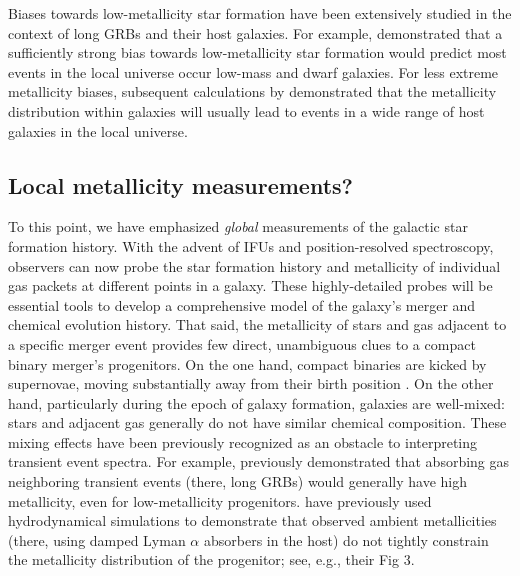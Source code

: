 \documentclass[nofootinbib,twocolumn,prd]{emulateapj}
\begin{document}
Biases towards low-metallicity star formation have been extensively studied in the context of long GRBs and their host galaxies.
%
For example, \cite{2009ApJ...702..377K} demonstrated that a sufficiently strong bias towards low-metallicity star formation would predict
most  events in the local universe occur low-mass and dwarf galaxies.
For less extreme metallicity biases, subsequent calculations by  \citet{2011MNRAS.417..567N} demonstrated that the
metallicity distribution within galaxies will usually lead to events in a wide range of host galaxies in the local universe.

\subsection{Local metallicity measurements?}
To this point, we have emphasized \emph{global} measurements of the galactic star formation history.  With the advent of
IFUs and position-resolved spectroscopy, observers can now probe the star formation history and metallicity of
individual gas packets at different points in a galaxy.  
%
These highly-detailed probes will be essential tools to develop a comprehensive model of the galaxy's merger and
chemical evolution history.  That said, the metallicity of stars and gas adjacent to a specific merger event provides
few direct, unambiguous clues to a compact binary merger's progenitors.  
On the one hand, compact binaries are kicked by supernovae, moving substantially away from their birth position
\cite{2013ApJ...776...18F,2014ARAA..52...43B}. 
On the other hand, particularly during the epoch of galaxy formation, galaxies are well-mixed: stars and adjacent gas generally do not have
similar chemical composition.  
These mixing effects have been previously recognized as an obstacle to interpreting transient event spectra.  For
example,   \cite{2010MNRAS.402.1523P} previously demonstrated that absorbing gas neighboring transient events (there, long GRBs)
would generally have high metallicity, even for low-metallicity progenitors.   
%
\citet{2010MNRAS.402.1523P} have previously used hydrodynamical simulations to demonstrate that observed ambient
metallicities (there, using damped Lyman $\alpha$ absorbers in the host) do not tightly constrain the metallicity
distribution of the progenitor; see, e.g., their Fig 3.
%





\end{document}
